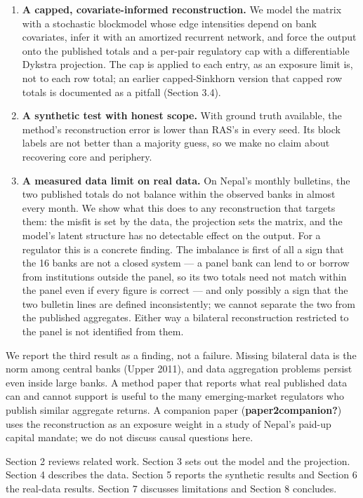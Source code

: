 \documentclass[
  a4paper,
]{article}
\providecommand{\tightlist}{%
  \setlength{\itemsep}{0pt}\setlength{\parskip}{0pt}}
\begin{document}
\begin{enumerate}
\def\labelenumi{\arabic{enumi}.}
\tightlist
\item
  \textbf{A capped, covariate-informed reconstruction.} We model the
  matrix with a stochastic blockmodel whose edge intensities depend on
  bank covariates, infer it with an amortized recurrent network, and
  force the output onto the published totals and a per-pair regulatory
  cap with a differentiable Dykstra projection. The cap is applied to
  each entry, as an exposure limit is, not to each row total; an earlier
  capped-Sinkhorn version that capped row totals is documented as a
  pitfall (Section 3.4).
\item
  \textbf{A synthetic test with honest scope.} With ground truth
  available, the method's reconstruction error is lower than RAS's in
  every seed. Its block labels are not better than a majority guess, so
  we make no claim about recovering core and periphery.
\item
  \textbf{A measured data limit on real data.} On Nepal's monthly
  bulletins, the two published totals do not balance within the observed
  banks in almost every month. We show what this does to any
  reconstruction that targets them: the misfit is set by the data, the
  projection sets the matrix, and the model's latent structure has no
  detectable effect on the output. For a regulator this is a concrete
  finding. The imbalance is first of all a sign that the 16 banks are
  not a closed system --- a panel bank can lend to or borrow from
  institutions outside the panel, so its two totals need not match
  within the panel even if every figure is correct --- and only possibly
  a sign that the two bulletin lines are defined inconsistently; we
  cannot separate the two from the published aggregates. Either way a
  bilateral reconstruction restricted to the panel is not identified
  from them.
\end{enumerate}

We report the third result as a finding, not a failure. Missing
bilateral data is the norm among central banks (Upper 2011), and data
aggregation problems persist even inside large banks. A method paper
that reports what real published data can and cannot support is useful
to the many emerging-market regulators who publish similar aggregate
returns. A companion paper (\textbf{paper2companion?}) uses the
reconstruction as an exposure weight in a study of Nepal's paid-up
capital mandate; we do not discuss causal questions here.

Section 2 reviews related work. Section 3 sets out the model and the
projection. Section 4 describes the data. Section 5 reports the
synthetic results and Section 6 the real-data results. Section 7
discusses limitations and Section 8 concludes.
\end{document}
